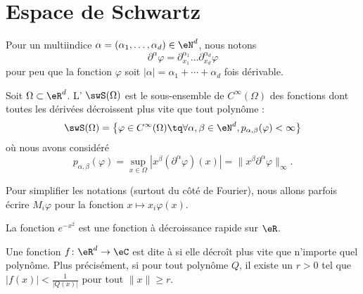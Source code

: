 \section{Espace de Schwartz}

Pour un multiindice \( \alpha=(\alpha_1,\ldots, \alpha_d)\in \eN^d\), nous notons
\begin{equation}
    \partial^{\alpha}\varphi=\partial_{x_1}^{\alpha_1}\ldots\partial_{x_d}^{\alpha_d}\varphi
\end{equation}
pour peu que la fonction \( \varphi\) soit \( | \alpha |=\alpha_1+\cdots +\alpha_d\) fois dérivable.

\begin{definition}  \label{DefHHyQooK}
    Soit \( \Omega\subset\eR^d\). L' \( \swS(\Omega)\) est le sous-ensemble de \(  C^{\infty}(\Omega)\) des fonctions dont toutes les dérivées décroissent plus vite que tout polynôme :
    \begin{equation}
        \swS(\Omega)=\big\{   \varphi\in C^{\infty}(\Omega)\tq\forall \alpha,\beta\in \eN^d, p_{\alpha,\beta}(\varphi)<\infty   \big\}
    \end{equation}
    où nous avons considéré
    \begin{equation}    \label{EqOWdChCu}
        p_{\alpha,\beta}(\varphi)=\sup_{x\in \Omega}| x^{\beta}(\partial^{\alpha}\varphi)(x) |=\| x^{\beta}\partial^{\alpha}\varphi \|_{\infty}.
    \end{equation}
\end{definition}

Pour simplifier les notations (surtout du côté de Fourier), nous allons parfois écrire \( M_i\varphi\) pour la fonction \( x\mapsto x_i\varphi(x)\).

\begin{example}
    La fonction \(  e^{-x^2}\) est une fonction à décroissance rapide sur \( \eR\).
\end{example}

\begin{definition}
    Une fonction \( f\colon \eR^d\to \eC\) est dite à  si elle décroît plus vite que n'importe quel polynôme. Plus précisément, si pour tout polynôme \( Q\), il existe un \( r>0\) tel que \(  | f(x) |<\frac{1}{ | Q(x) | } \) pour tout \( \| x \|\geq r\).
\end{definition}

